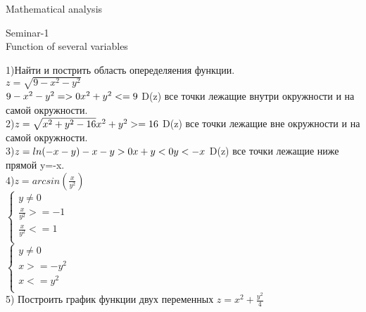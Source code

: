 \documentclass[a4paper,11pt,twoside]{book}
\begin{document}

    \begin{center}
        \LARGE Mathematical analysis
    \end{center}
    \newpage
    \begin{center}
        \LARGE Seminar-1\\
        \LARGE Function of several variables\\
    \end{center}
    1)Найти и пострить область опеределяения функции.\\
    $z=\sqrt{9-x^2-y^2}$\\
    $9-x^2-y^2=>0\\
    x^2+y^2<=9\\$
    D(z) все точки лежащие внутри окружности и на самой окружности.\\
    2)$z=\sqrt{x^2+y^2-16}\\
    x^2+y^2>=16\\$
    D(z) все точки лежащие вне окружности и на самой окружности.\\
    3)$z=ln(-x-y)\\
    -x-y>0\\
    x+y<0\\
    y<-x$
    D(z) все точки лежащие ниже прямой y=-x.\\
    4)$z=arcsin(\frac{x}{y^2})$\\
    $\begin{cases}
        y \neq 0\\
        \frac{x}{y^2}>=-1\\
        \frac{x}{y^2}<=1\\
    \end{cases}$\\
    $\begin{cases}
        y \neq 0\\
        x>=-y^2\\
        x<=y^2\\
    \end{cases}$\\
    5) Построить график функции двух переменных $z=x^2+\frac{y^2}{4}$\\
\end{document}
